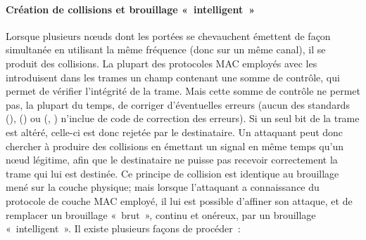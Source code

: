         \paragraph{Création de collisions et brouillage « intelligent »}
Lorsque plusieurs nœuds dont les portées se chevauchent émettent de façon simultanée en utilisant la même fréquence (donc sur un même canal), il se produit des collisions.
La plupart des protocoles MAC employés avec les \rcs introduisent dans les trames un champ contenant une somme de contrôle, qui permet de vérifier l'intégrité de la trame.
Mais cette somme de contrôle ne permet pas, la plupart du temps, de corriger d'éventuelles erreurs (aucun des standards \ieeee (\wifi), \ieeefo (\bluetooth) ou \ieeeff (\zigbee, \slowpan) n'inclue de code de correction des erreurs).
Si un seul bit de la trame est altéré, celle-ci est donc rejetée par le destinataire.
Un attaquant peut donc chercher à produire des collisions en émettant un signal en même temps qu'un nœud légitime, afin que le destinataire ne puisse pas recevoir correctement la trame qui lui est destinée.
Ce principe de collision est identique au brouillage mené sur la couche physique; mais lorsque l'attaquant a connaissance du protocole de couche MAC employé, il lui est possible d'affiner son attaque, et de remplacer un brouillage « brut », continu et onéreux, par un brouillage « intelligent ».
Il existe plusieurs façons de procéder~\cite{PI11}:
